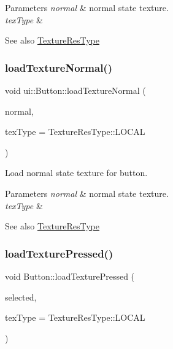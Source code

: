 \begin{DoxyParams}{Parameters}
{\em normal} & normal state texture. \\
\hline
{\em tex\+Type} & \\
\hline
\end{DoxyParams}
\begin{DoxySeeAlso}{See also}
{\ttfamily \hyperlink{classui_1_1Widget_a040a65ec5ad3b11119b7e16b98bd9af0}{Texture\+Res\+Type}} 
\end{DoxySeeAlso}
\mbox{\label{classui_1_1Button_a2714b3c9a7ec3f7bf89aef9beb491158}} 
\subsubsection{\texorpdfstring{load\+Texture\+Normal()}{loadTextureNormal()}\hspace{0.1cm}{\footnotesize\ttfamily [2/2]}}
{\footnotesize\ttfamily void ui\+::\+Button\+::load\+Texture\+Normal (\begin{DoxyParamCaption}\item[{const std\+::string \&}]{normal,  }\item[{\hyperlink{classui_1_1Widget_a040a65ec5ad3b11119b7e16b98bd9af0}{Texture\+Res\+Type}}]{tex\+Type = {\ttfamily TextureResType\+:\+:LOCAL} }\end{DoxyParamCaption})}

Load normal state texture for button.


\begin{DoxyParams}{Parameters}
{\em normal} & normal state texture. \\
\hline
{\em tex\+Type} & \\
\hline
\end{DoxyParams}
\begin{DoxySeeAlso}{See also}
{\ttfamily \hyperlink{classui_1_1Widget_a040a65ec5ad3b11119b7e16b98bd9af0}{Texture\+Res\+Type}} 
\end{DoxySeeAlso}
\mbox{\label{classui_1_1Button_a6d015dcd56225cb1ddb8f5f6d7ccfa09}} 
\subsubsection{\texorpdfstring{load\+Texture\+Pressed()}{loadTexturePressed()}\hspace{0.1cm}{\footnotesize\ttfamily [1/2]}}
{\footnotesize\ttfamily void Button\+::load\+Texture\+Pressed (\begin{DoxyParamCaption}\item[{const std\+::string \&}]{selected,  }\item[{\hyperlink{classui_1_1Widget_a040a65ec5ad3b11119b7e16b98bd9af0}{Texture\+Res\+Type}}]{tex\+Type = {\ttfamily TextureResType\+:\+:LOCAL} }\end{DoxyParamCaption})}


